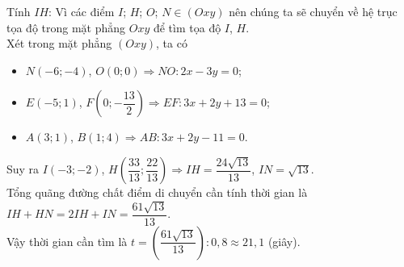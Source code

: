 \begin{ex}
{		Tính $IH$: Vì các điểm $I$; $H$; $O$; $N \in (Oxy)$ nên chúng ta sẽ chuyển về hệ trục tọa độ trong mặt phẳng $Oxy$ để tìm tọa độ $I$, $H$.\\
		Xét trong mặt phẳng $(Oxy)$, ta có
		\begin{itemize}
			\item $N(-6;-4)$, $O(0;0) \Rightarrow NO\colon 2x - 3y = 0$; 
			\item $E(-5;1)$, $F\left(0;-\dfrac{13}{2}\right) \Rightarrow EF\colon 3x + 2y + 13 = 0$; 
			\item $A(3;1)$, $B(1;4) \Rightarrow AB\colon 3x + 2y - 11 = 0$.
		\end{itemize}
		Suy ra $I(-3;-2)$, $H\left(\dfrac{33}{13}; \dfrac{22}{13}\right) \Rightarrow IH = \dfrac{24\sqrt{13}}{13}$, $IN = \sqrt{13}$.\\
		Tổng quãng đường chất điểm di chuyển cần tính thời gian là 
		$IH + HN = 2IH + IN = \dfrac{61\sqrt{13}}{13}$.\\
		Vậy thời gian cần tìm là $t = \left(\dfrac{61\sqrt{13}}{13}\right) : 0{,}8 \approx 21{,}1$ (giây).
	}
\end{ex}

